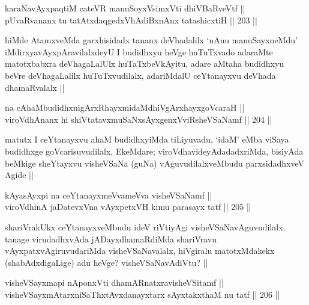 \begin{shl}
karaNavAyxpaqtiM cateVR manuSoyxV\s simxVti dhiVBaRveVtf || \\
pUvaRvananx tu tatAtxdaqgedxVhAdiBxnAnx tatashicxtiH ||  203 || 
\end{shl}

\begin{artha}
hiMde AtamxveMda garxhisidadx tananx deVhadalilx `nAnu manuSayxneMdu' iMdirxyavAyxpAravilalxdeyU I budidhxyu heVge huTuTxvado adaraMte matotxbabxra deVhagaLalUlx huTaTxbeVkAyitu, adare aMtaha budidhxyu beVre deVhagaLalilx huTuTxvudilalx, adariMdalU ceYtanayxvu deVhada dhamaRvalalx ||
\end{artha}


\begin{shl}
na cAhaMbudidhxnigArxRhayxmidaMdhiVgArxhayxgoVcaraH ||  \\
viroVdhAnanx hi shiVtatavxmuSaNxsAyxgenxVviRsheVSaNamf ||  204 ||  
\end{shl}

\begin{artha}
matutx I ceYtanayxvu ahaM budidhxyiMda tiLiyuvadu, `idaM' eMba viSaya budidhxge goVcarisuvudilalx, EkeMdare; viroVdhavideyAdadadxriMda, bisiyAda beMkige sheYtayxvu visheVSaNa (guNa) vAguvudilalxveMbudu parxsidadhxveV Agide ||
\end{artha}

\begin{shl}
kAyasAyxpi na ceYtanayxmeVvameVva visheVSaNamf || \\
viroVdhinA jaDatevxVna vAyxpetxVH kimu parasayx tatf ||  205 ||  
\end{shl}

\begin{artha}
shariVrakUkx ceYtanayxveMbudu ideV riVtiyAgi visheVSaNavAguvudilalx. tanage virudadhxvAda jADayxdhamaRdiMda  shariVravu vAyxpatxvAgiruvudariMda visheVSaNavalalx, hiVgiralu matotxMdakekx (shabAdxdigaLige) adu heVge? visheVSaNavAdiVtu? ||
\end{artha}


\begin{shl}
visheVSayxmapi nA\s \s ponxVti dhamARnatxravisheVSitamf || \\
visheVSayxmAtarxniSaThxtAvxdanayxtarx sAyxtakxthaM nu tatf ||  206 ||  
\end{shl}

